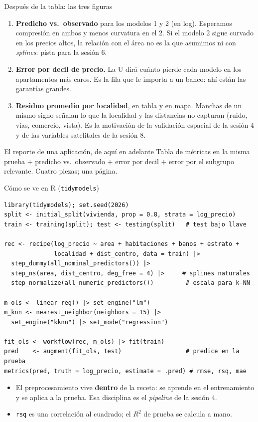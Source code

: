 \documentclass{beamer}
\newcommand{\1}{\mathbb{I}}
\begin{document}
\begin{frame}{Después de la tabla: las tres figuras}
\small
\begin{enumerate}\itemsep6pt
  \item \textbf{Predicho vs.\ observado} para los modelos 1 y 2 (en log). Esperamos compresión en ambos y menos curvatura en el 2. Si el modelo 2 sigue curvado en los precios altos, la relación con el área no es la que asumimos ni con \emph{splines}: pista para la sesión 6. \pause
  \item \textbf{Error por decil de precio.} La U dirá cuánto pierde cada modelo en los apartamentos más caros. Es la fila que le importa a un banco: ahí están las garantías grandes. \pause
  \item \textbf{Residuo promedio por localidad}, en tabla y en mapa. Manchas de un mismo signo señalan lo que la localidad y las distancias no capturan (ruido, vías, comercio, vista). Es la motivación de la validación espacial de la sesión 4 y de las variables satelitales de la sesión 8.
\end{enumerate}
\pause
\vspace{0.1cm}
\begin{block}{El reporte de una aplicación, de aquí en adelante}
Tabla de métricas en la misma prueba $+$ predicho vs.\ observado $+$ error por decil $+$ error por el subgrupo relevante. Cuatro piezas; una página.
\end{block}
\end{frame}

\begin{frame}[fragile]{Cómo se ve en R (\texttt{tidymodels})}
\scriptsize
\begin{verbatim}
library(tidymodels); set.seed(2026)
split <- initial_split(vivienda, prop = 0.8, strata = log_precio)
train <- training(split); test <- testing(split)   # test bajo llave

rec <- recipe(log_precio ~ area + habitaciones + banos + estrato +
              localidad + dist_centro, data = train) |>
  step_dummy(all_nominal_predictors()) |>
  step_ns(area, dist_centro, deg_free = 4) |>     # splines naturales
  step_normalize(all_numeric_predictors())         # escala para k-NN

m_ols <- linear_reg() |> set_engine("lm")
m_knn <- nearest_neighbor(neighbors = 15) |>
  set_engine("kknn") |> set_mode("regression")

fit_ols <- workflow(rec, m_ols) |> fit(train)
pred    <- augment(fit_ols, test)                  # predice en la prueba
metrics(pred, truth = log_precio, estimate = .pred) # rmse, rsq, mae
\end{verbatim}
\normalsize
\small
\begin{itemize}\itemsep2pt
  \item El preprocesamiento vive \textbf{dentro} de la receta: se aprende en el entrenamiento y se aplica a la prueba. Esa disciplina es el \emph{pipeline} de la sesión 4.
  \item \texttt{rsq} es una correlación al cuadrado; el $R^2$ de prueba se calcula a mano.
\end{itemize}
\end{frame}
\end{document}
